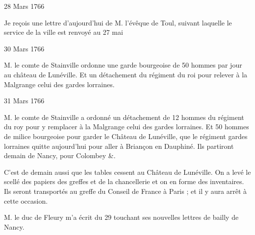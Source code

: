                      \begin{diary}{28 Mars 1766}{}

                         Je reçois une lettre d'aujourd'hui de
                           M. l'évêque de Toul, suivant
                           laquelle
                           le service de la ville est renvoyé au 27
                              mai
                        \bigskip


                     \end{diary}

                     \begin{diary}{30 Mars 1766}{}


                           M. le comte de Stainville ordonne
                           une
                           garde bourgeoise de 50 hommes par jour au
                           château de
                              Lunéville. Et un détachement
                           du régiment du roi pour relever à la Malgrange
                           celui des gardes
                           lorraines. \bigskip


                     \end{diary}


                     \begin{diary}{31 Mars 1766}{}


                           M. le comte de Stainville a
                           ordonné un
                           détachement de 12 hommes du régiment du roy pour
                           y remplacer à la
                              Malgrange
                           celui des gardes lorraines.
                           Et 50 hommes de milice bourgeoise
                           pour garder
                           le Château de
                              Lunéville, que le régiment gardes
                              lorraines quitte aujourd'hui pour aller à
                           Briançon en Dauphiné. Ils
                           partiront demain
                           de Nancy, pour Colombey \&. \bigskip



                         C'est de demain aussi que les tables cessent
                           au Château de
                              Lunéville. On a levé le scellé
                           des papiers des greffes et de la
                              chancellerie
                           et on en forme des inventaires. Ils seront
                           transportés au greffe du Conseil de France
                           à Paris ; et il y aura arrêt à
                           cette
                           occasion. \bigskip



                           M. le duc de Fleury m'a écrit du
                              29
                           touchant ses nouvelles lettres de bailly
                           de Nancy. \bigskip


                     \end{diary}

